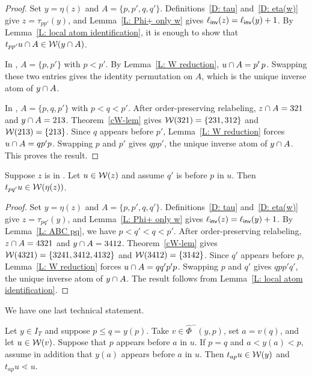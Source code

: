 \documentclass[10pt]{article}
\begin{document}
\begin{proof}
Set $y=\eta(z)$ and $A=\{p,p',q,q'\}$.
Definitions~\ref{D: tau} and~\ref{D: eta(w)} give $z=\tau_{pp'}(y)$,
and Lemma~\ref{L: Phi+ only w} gives $\ell_{\mathsf{inv}}(z)=\ell_{\mathsf{inv}}(y)+1$.
By Lemma~\ref{L: local atom identification}, it is enough to show that
$t_{pp'}u\cap A\in\mathcal{W}(y\cap A)$.

In \CaseA, $A=\{p,p'\}$ with $p<p'$.
By Lemma~\ref{L: W reduction}, $u\cap A=p'\,p$.
Swapping these two entries gives the identity permutation on $A$,
which is the unique inverse atom of $y\cap A$.

In \CaseB, $A=\{p,q,p'\}$ with $p<q<p'$.
After order-preserving relabeling, $z\cap A=321$ and
$y\cap A=213$.
Theorem~\ref{cW-lem} gives $\mathcal{W}(321)=\{231,312\}$ and
$\mathcal{W}(213)=\{213\}$.
Since $q$ appears before $p'$, Lemma~\ref{L: W reduction} forces
$u\cap A=qp'p$.
Swapping $p$ and $p'$ gives $qpp'$, the unique inverse atom
of $y\cap A$.
This proves the result. 
\end{proof}

\begin{lemma}
\label{L: C eta(w)}
Suppose $z$ is in \CaseC. Let $u\in\mathcal{W}(z)$ and assume $q'$ is before $p$ in $u$.
Then $t_{pq'}u\in\mathcal{W}(\eta(z))$.
\end{lemma}

\begin{proof}
Set $y=\eta(z)$ and $A=\{p,p',q,q'\}$.
Definitions~\ref{D: tau} and~\ref{D: eta(w)} give $z=\tau_{pq'}(y)$,
and Lemma~\ref{L: Phi+ only w} gives $\ell_{\mathsf{inv}}(z)=\ell_{\mathsf{inv}}(y)+1$.
By Lemma~\ref{L: ABC pq}, we have $p<q'<q<p'$.
After order-preserving relabeling, $z\cap A=4321$ and
$y\cap A=3412$.
Theorem~\ref{cW-lem} gives $\mathcal{W}(4321)=\{3241,3412,4132\}$ and
$\mathcal{W}(3412)=\{3142\}$.
Since $q'$ appears before $p$, Lemma~\ref{L: W reduction} forces
$u\cap A=qq'p'p$.
Swapping $p$ and $q'$ gives $qpp'q'$, the unique inverse atom
of $y\cap A$.
The result follows from Lemma~\ref{L: local atom identification}.
\end{proof}

We have one last technical statement.

\begin{lemma}
\label{L: reverse Fuse in Phi}
Let $y\in I_T$ and suppose $p\leq q=y(p)$.
Take $v\in\hat\Phi^{-}(y,p)$, set $a=v(q)$, and let $u\in\mathcal{W}(v)$.
Suppose that $p$ appears before $a$ in $u$.
If $p=q$ and $a<y(a)<p$, assume in addition that $y(a)$ appears
before $a$ in $u$.
Then $t_{ap}u\in\mathcal{W}(y)$ and $t_{ap}u\lessdot u$.
\end{lemma}
\end{document}
